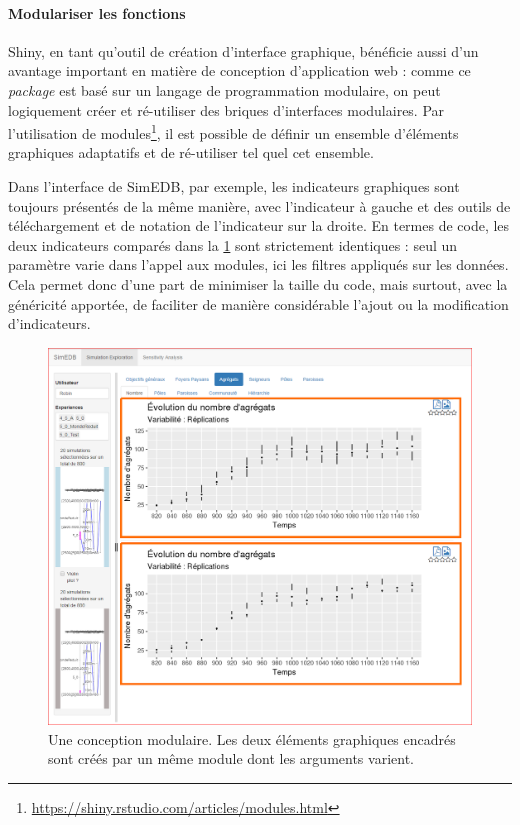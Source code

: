 \paragraph*{Modulariser les fonctions}

Shiny, en tant qu'outil de création d'interface graphique, bénéficie aussi d'un avantage important en matière de conception d'application web : comme ce \textit{package} est basé sur un langage de programmation modulaire, on peut logiquement créer et ré-utiliser des \og briques d'interfaces\fg{} modulaires.
Par l'utilisation de modules\footnote{\href{https://shiny.rstudio.com/articles/modules.html}{https://shiny.rstudio.com/articles/modules.html}}, il est possible de définir un ensemble d'éléments graphiques adaptatifs et de ré-utiliser tel quel cet ensemble.

Dans l'interface de SimEDB, par exemple, les indicateurs graphiques sont toujours présentés de la même manière, avec l'indicateur à gauche et des outils de téléchargement et de notation de l'indicateur sur la droite.
En termes de code, les deux indicateurs comparés dans la \cref{fig:simedb-modules} sont strictement identiques : seul un paramètre varie dans l'appel aux modules, ici les filtres appliqués sur les données.
Cela permet donc d'une part de minimiser la taille du code, mais surtout, avec la généricité apportée, de faciliter de manière considérable l'ajout ou la modification d'indicateurs.

\begin{figure}[H]
\centering
\includegraphics[width=\linewidth]{img/SimEDB_modules.png}
\caption{Une conception modulaire. Les deux éléments graphiques encadrés sont créés par un même \og module\fg{} dont les arguments varient.}
\label{fig:simedb-modules}
\end{figure}



